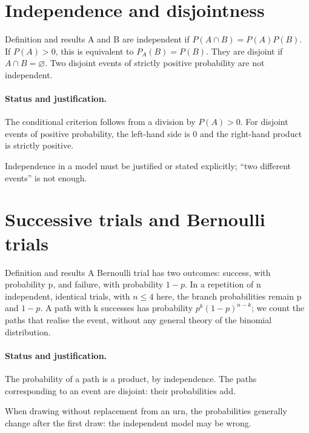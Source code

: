 \section{Independence and disjointness}\label{C05-U3}
\begin{repere}{Definition and results}
A and B are independent if $P(A\cap B)=P(A)P(B)$. If $P(A)>0$, this is equivalent to $P_A(B)=P(B)$. They are disjoint if $A\cap B=\varnothing$. Two disjoint events of strictly positive probability are not independent.
\end{repere}
\paragraph{Status and justification.} The conditional criterion follows from a division by $P(A)>0$. For disjoint events of positive probability, the left-hand side is 0 and the right-hand product is strictly positive.
\label{C05-EX3}
\begin{erreur}Independence in a model must be justified or stated explicitly; ``two different events'' is not enough.\end{erreur}
\label{C05-AP3}
\section{Successive trials and Bernoulli trials}\label{C05-U4}
\begin{repere}{Definition and results}
A Bernoulli trial has two outcomes: success, with probability p, and failure, with probability $1-p$. In a repetition of n independent, identical trials, with $n\leq4$ here, the branch probabilities remain p and $1-p$. A path with k successes has probability $p^k(1-p)^{n-k}$; we count the paths that realise the event, without any general theory of the binomial distribution.
\end{repere}
\paragraph{Status and justification.} The probability of a path is a product, by independence. The paths corresponding to an event are disjoint: their probabilities add.
\label{C05-EX4}
\begin{erreur}When drawing without replacement from an urn, the probabilities generally change after the first draw: the independent model may be wrong.\end{erreur}
\label{C05-AP4}
